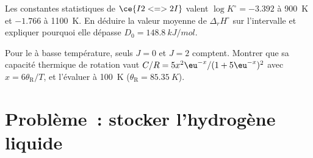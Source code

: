 \begin{exercise}[$\star\star\star$]\label{exo:b3:statistical-thermo-applied:11}
Les constantes statistiques de $\ce{I2 <=> 2 I}$ valent $\log K^\circ = -3.392$ à \qty{900}{K} et
$-1.766$ à \qty{1100}{K}. En déduire la valeur moyenne de
$\Delta_rH^\circ$ sur l'intervalle et expliquer
pourquoi elle dépasse $D_0 = \qty{148.8}{kJ/mol}$.
\end{exercise}

\begin{exercise}[$\star\star\star$]\label{exo:b3:statistical-thermo-applied:12}
Pour le  à basse température, seuls $J = 0$ et $J = 2$
comptent. Montrer que
sa capacité thermique de rotation vaut $C/R = 5x^2\eu^{-x}/(1 + 5\eu^{-x})^2$ avec $x = 6\theta_{\mathrm R}/T$, et
l'évaluer à \qty{100}{K} ($\theta_{\mathrm R} = \qty{85.35}{K}$).
\end{exercise}

\section{Problème~: stocker l'hydrogène liquide}

